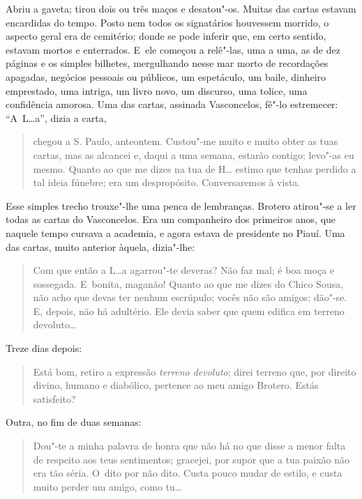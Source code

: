 Abriu a gaveta; tirou dois ou três maços e desatou"-os. Muitas das cartas
estavam encardidas do tempo. Posto nem todos os signatários houvessem
morrido, o aspecto geral era de cemitério; donde se pode inferir que, em
certo sentido, estavam mortos e enterrados. E~ele começou a relê"-las,
uma a uma, as de dez páginas e os simples bilhetes, mergulhando nesse
mar morto de recordações apagadas, negócios pessoais ou públicos, um
espetáculo, um baile, dinheiro emprestado, uma intriga, um livro novo,
um discurso, uma tolice, uma confidência amorosa. Uma das cartas,
assinada Vasconcelos, fê"-lo estremecer: ``A~L\ldots{}a'', dizia a carta,

\begin{quote}
chegou a S. Paulo, anteontem. Custou"-me muito e muito obter as tuas
cartas, mas as alcancei e, daqui a uma semana, estarão contigo; levo"-as
eu mesmo. Quanto ao que me dizes na tua de H\ldots{} estimo que tenhas
perdido a tal ideia fúnebre; era um despropósito. Conversaremos à vista.
\end{quote}

Esse simples trecho trouxe"-lhe uma penca de lembranças. Brotero
atirou"-se a ler todas as cartas do Vasconcelos. Era um companheiro dos
primeiros anos, que naquele tempo cursava a academia, e agora estava de
presidente no Piauí. Uma das cartas, muito anterior àquela, dizia"-lhe:

\begin{quote}
Com que então a L\ldots{}a agarrou"-te deveras? Não faz mal; é boa moça e
sossegada. E~bonita, maganão! Quanto ao que me dizes do Chico Sousa, não
acho que devas ter nenhum escrúpulo; vocês não são amigos; dão"-se. E,
depois, não há adultério. Ele devia saber que quem edifica em terreno
devoluto\ldots{}
\end{quote}

Treze dias depois:

\begin{quote}
Está bom, retiro a expressão \emph{terreno devoluto}; direi terreno que,
por direito divino, humano e diabólico, pertence ao meu amigo Brotero.
Estás satisfeito?
\end{quote}

Outra, no fim de duas semanas:

\begin{quote}
Dou"-te a minha palavra de honra que não há no que disse a menor falta de
respeito aos teus sentimentos; gracejei, por supor que a tua paixão não
era tão séria. O~dito por não dito. Custa pouco mudar de estilo, e custa
muito perder um amigo, como tu\ldots{}
\end{quote}

